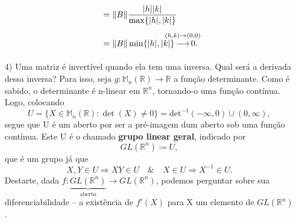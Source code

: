 \documentclass[../analysisII_notes.tex]{subfiles}
\begin{document}
\begin{example}
\begin{itemize}
\begin{align*}
			                                                       & = \Vert B \Vert \frac{|h||k|}{\max\limits_{}\{|h|, |k|\}}                                                     \\
			                                                       & = \Vert B \Vert \min\limits_{}\{|h|, |k|\} \overbracket[0pt]{\longrightarrow}^{\mathclap{(h, k)\to (0, 0)}}0.
		      \end{align*}
		\item[4)] Uma matriz é invertível quando ela tem uma inversa. Qual será a derivada dessa inversa? Para isso, seja \(g:\mathbb{M}_{n}(\mathbb{R})\rightarrow \mathbb{R}\) a função determinante. Como é sabido, o determinante é n-linear em \(\mathbb{R}^{n}\),
		      tornando-o uma função contínua. Logo, colocando
		      \[
			      U = \{X\in \mathbb{M}_{n}(\mathbb{R}): \det{(X)}\neq0\} = \mathrm{det}^{-1}{(-\infty, 0)\cup (0, \infty)},
		      \]
		      segue que U é um aberto por ser a pré-imagem dum aberto sob uma função contínua. Este U é o chamado \textbf{grupo linear geral}, indicado por
		      \[
			      GL(\mathbb{R}^{n}) \coloneqq U,
		      \]
		      que é um grupo já que
		      \[
			      X, Y\in U \Rightarrow XY\in U \quad\&\quad X\in U \Rightarrow X^{-1}\in U.
		      \]
		      Destarte, dada \(f:\underbrace{GL(\mathbb{R}^{n})}_{\text{aberto}}\rightarrow GL(\mathbb{R}^{n})\), podemos perguntar sobre sua diferenciabilidade -- a existência de \(f'(X)\) para X um elemento de \(GL(\mathbb{R}^{n})\).


\end{itemize}
\end{example}
\end{document}
